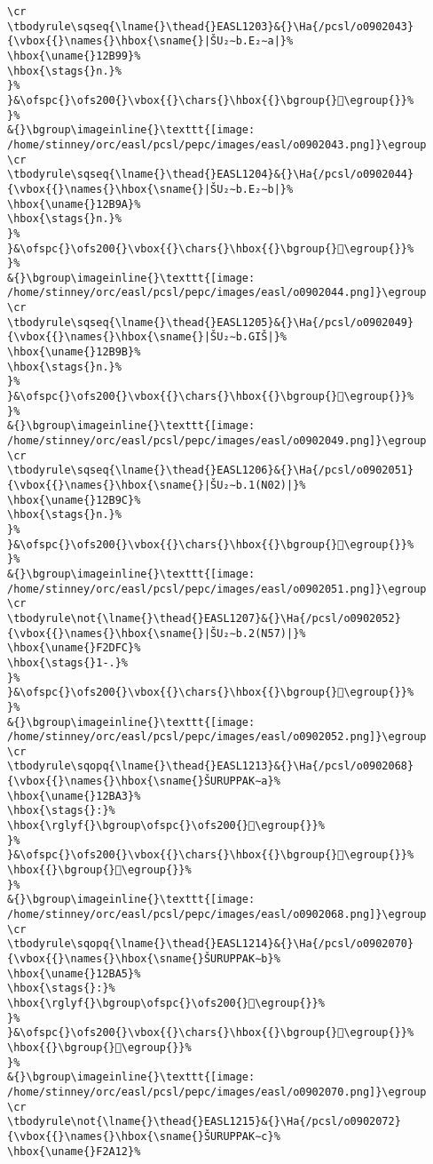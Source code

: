 \begin{verbatim}
\cr
\tbodyrule\sqseq{\lname{}\thead{}EASL1203}&{}\Ha{/pcsl/o0902043}{\vbox{{}\names{}\hbox{\sname{}|ŠU₂∼b.E₂∼a|}%
\hbox{\uname{}12B99}%
\hbox{\stags{}n.}%
}%
}&\ofspc{}\ofs200{}\vbox{{}\chars{}\hbox{{}\bgroup{}𒮙\egroup{}}%
}%
&{}\bgroup\imageinline{}\texttt{[image: /home/stinney/orc/easl/pcsl/pepc/images/easl/o0902043.png]}\egroup
\cr
\tbodyrule\sqseq{\lname{}\thead{}EASL1204}&{}\Ha{/pcsl/o0902044}{\vbox{{}\names{}\hbox{\sname{}|ŠU₂∼b.E₂∼b|}%
\hbox{\uname{}12B9A}%
\hbox{\stags{}n.}%
}%
}&\ofspc{}\ofs200{}\vbox{{}\chars{}\hbox{{}\bgroup{}𒮚\egroup{}}%
}%
&{}\bgroup\imageinline{}\texttt{[image: /home/stinney/orc/easl/pcsl/pepc/images/easl/o0902044.png]}\egroup
\cr
\tbodyrule\sqseq{\lname{}\thead{}EASL1205}&{}\Ha{/pcsl/o0902049}{\vbox{{}\names{}\hbox{\sname{}|ŠU₂∼b.GIŠ|}%
\hbox{\uname{}12B9B}%
\hbox{\stags{}n.}%
}%
}&\ofspc{}\ofs200{}\vbox{{}\chars{}\hbox{{}\bgroup{}𒮛\egroup{}}%
}%
&{}\bgroup\imageinline{}\texttt{[image: /home/stinney/orc/easl/pcsl/pepc/images/easl/o0902049.png]}\egroup
\cr
\tbodyrule\sqseq{\lname{}\thead{}EASL1206}&{}\Ha{/pcsl/o0902051}{\vbox{{}\names{}\hbox{\sname{}|ŠU₂∼b.1(N02)|}%
\hbox{\uname{}12B9C}%
\hbox{\stags{}n.}%
}%
}&\ofspc{}\ofs200{}\vbox{{}\chars{}\hbox{{}\bgroup{}𒮜\egroup{}}%
}%
&{}\bgroup\imageinline{}\texttt{[image: /home/stinney/orc/easl/pcsl/pepc/images/easl/o0902051.png]}\egroup
\cr
\tbodyrule\not{\lname{}\thead{}EASL1207}&{}\Ha{/pcsl/o0902052}{\vbox{{}\names{}\hbox{\sname{}|ŠU₂∼b.2(N57)|}%
\hbox{\uname{}F2DFC}%
\hbox{\stags{}1-.}%
}%
}&\ofspc{}\ofs200{}\vbox{{}\chars{}\hbox{{}\bgroup{}󲷼\egroup{}}%
}%
&{}\bgroup\imageinline{}\texttt{[image: /home/stinney/orc/easl/pcsl/pepc/images/easl/o0902052.png]}\egroup
\cr
\tbodyrule\sqopq{\lname{}\thead{}EASL1213}&{}\Ha{/pcsl/o0902068}{\vbox{{}\names{}\hbox{\sname{}ŠURUPPAK∼a}%
\hbox{\uname{}12BA3}%
\hbox{\stags{}:}%
\hbox{\rglyf{}\bgroup\ofspc{}\ofs200{}𒮣\egroup{}}%
}%
}&\ofspc{}\ofs200{}\vbox{{}\chars{}\hbox{{}\bgroup{}𒮢\egroup{}}%
\hbox{{}\bgroup{}𒮣\egroup{}}%
}%
&{}\bgroup\imageinline{}\texttt{[image: /home/stinney/orc/easl/pcsl/pepc/images/easl/o0902068.png]}\egroup
\cr
\tbodyrule\sqopq{\lname{}\thead{}EASL1214}&{}\Ha{/pcsl/o0902070}{\vbox{{}\names{}\hbox{\sname{}ŠURUPPAK∼b}%
\hbox{\uname{}12BA5}%
\hbox{\stags{}:}%
\hbox{\rglyf{}\bgroup\ofspc{}\ofs200{}𒮥\egroup{}}%
}%
}&\ofspc{}\ofs200{}\vbox{{}\chars{}\hbox{{}\bgroup{}𒮤\egroup{}}%
\hbox{{}\bgroup{}𒮥\egroup{}}%
}%
&{}\bgroup\imageinline{}\texttt{[image: /home/stinney/orc/easl/pcsl/pepc/images/easl/o0902070.png]}\egroup
\cr
\tbodyrule\not{\lname{}\thead{}EASL1215}&{}\Ha{/pcsl/o0902072}{\vbox{{}\names{}\hbox{\sname{}ŠURUPPAK∼c}%
\hbox{\uname{}F2A12}%

\end{verbatim}
